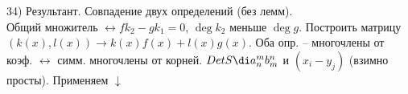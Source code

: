 34) Результант. Совпадение двух определений (без лемм).\\
Общий множитель $\leftrightarrow f k_2 - g k_1 = 0$, $\deg k_2$ меньше $\deg g$.
Построить матрицу $(k(x),l(x)) \to k(x)f(x)+l(x)g(x)$.
Оба опр. -- многочлены от коэф. $\leftrightarrow$ симм. многочлены от корней. $Det S \di a_n^mb_m^n$ и $(x_i - y_j)$ (взимно просты). Применяем $\downarrow$ 
\\
